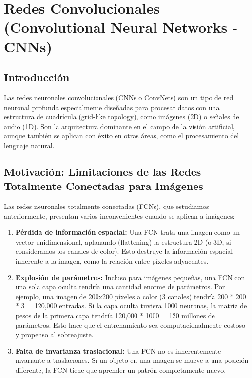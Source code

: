 \documentclass{article}
\begin{document}
\section{Redes Convolucionales (Convolutional Neural Networks - CNNs)}

\subsection{Introducción}

Las redes neuronales convolucionales (CNNs o ConvNets) son un tipo de red neuronal profunda especialmente diseñadas para procesar datos con una estructura de cuadrícula (grid-like topology), como imágenes (2D) o señales de audio (1D).  Son la arquitectura dominante en el campo de la visión artificial, aunque también se aplican con éxito en otras áreas, como el procesamiento del lenguaje natural.

\subsection{Motivación: Limitaciones de las Redes Totalmente Conectadas para Imágenes}

Las redes neuronales totalmente conectadas (FCNs), que estudiamos anteriormente, presentan varios inconvenientes cuando se aplican a imágenes:

\begin{enumerate}
    \item \textbf{Pérdida de información espacial:}  Una FCN trata una imagen como un vector unidimensional, aplanando (flattening) la estructura 2D (o 3D, si consideramos los canales de color).  Esto destruye la información espacial inherente a la imagen, como la relación entre píxeles adyacentes.
    \item \textbf{Explosión de parámetros:}  Incluso para imágenes pequeñas, una FCN con una sola capa oculta tendría una cantidad enorme de parámetros.  Por ejemplo, una imagen de 200x200 píxeles a color (3 canales) tendría 200 * 200 * 3 = 120,000 entradas.  Si la capa oculta tuviera 1000 neuronas, la matriz de pesos de la primera capa tendría 120,000 * 1000 = 120 millones de parámetros.  Esto hace que el entrenamiento sea computacionalmente costoso y propenso al sobreajuste.
    \item \textbf{Falta de invarianza traslacional:} Una FCN no es inherentemente invariante a traslaciones. Si un objeto en una imagen se mueve a una posición diferente, la FCN tiene que aprender un patrón completamente nuevo.
\end{enumerate}
\end{document}
